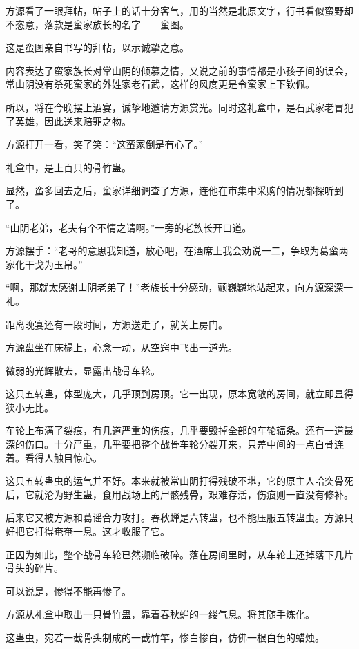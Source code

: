 
\begin{this_body}

方源看了一眼拜帖，帖子上的话十分客气，用的当然是北原文字，行书看似蛮野却不恣意，落款是蛮家族长的名字——蛮图。

这是蛮图亲自书写的拜帖，以示诚挚之意。

内容表达了蛮家族长对常山阴的倾慕之情，又说之前的事情都是小孩子间的误会，常山阴没有杀死蛮家的外姓家老石武，这样的风度更是令蛮家上下钦佩。

所以，将在今晚摆上酒宴，诚挚地邀请方源赏光。同时这礼盒中，是石武家老冒犯了英雄，因此送来赔罪之物。

方源打开一看，笑了笑：“这蛮家倒是有心了。”

礼盒中，是上百只的骨竹蛊。

显然，蛮多回去之后，蛮家详细调查了方源，连他在市集中采购的情况都探听到了。

“山阴老弟，老夫有个不情之请啊。”一旁的老族长开口道。

方源摆手：“老哥的意思我知道，放心吧，在酒席上我会劝说一二，争取为葛蛮两家化干戈为玉帛。”

“啊，那就太感谢山阴老弟了！”老族长十分感动，颤巍巍地站起来，向方源深深一礼。

距离晚宴还有一段时间，方源送走了，就关上房门。

方源盘坐在床榻上，心念一动，从空窍中飞出一道光。

微弱的光辉散去，显露出战骨车轮。

这只五转蛊，体型庞大，几乎顶到房顶。它一出现，原本宽敞的房间，就立即显得狭小无比。

车轮上布满了裂痕，有几道严重的伤痕，几乎要毁掉全部的车轮辐条。还有一道最深的伤口。十分严重，几乎要把整个战骨车轮分裂开来，只差中间的一点白骨连着。看得人触目惊心。

这只五转蛊虫的运气并不好。本来就被常山阴打得残破不堪，它的原主人哈突骨死后，它就沦为野生蛊，食用战场上的尸骸残骨，艰难存活，伤痕则一直没有修补。

后来它又被方源和葛谣合力攻打。春秋蝉是六转蛊，也不能压服五转蛊虫。方源只好把它打得奄奄一息。这才收服了它。

正因为如此，整个战骨车轮已然濒临破碎。落在房间里时，从车轮上还掉落下几片骨头的碎片。

可以说是，惨得不能再惨了。

方源从礼盒中取出一只骨竹蛊，靠着春秋蝉的一缕气息。将其随手炼化。

这蛊虫，宛若一截骨头制成的一截竹竿，惨白惨白，仿佛一根白色的蜡烛。


\end{this_body}
